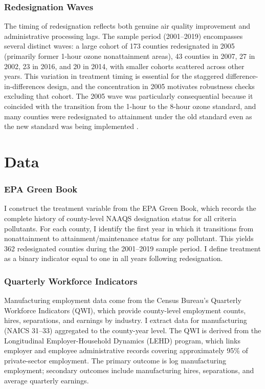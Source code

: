 \documentclass[12pt]{article}
\begin{document}
\subsubsection*{Redesignation Waves} The timing of redesignation reflects both genuine air quality improvement and administrative processing lags. The sample period (2001--2019) encompasses several distinct waves: a large cohort of 173 counties redesignated in 2005 (primarily former 1-hour ozone nonattainment areas), 43 counties in 2007, 27 in 2002, 23 in 2016, and 20 in 2014, with smaller cohorts scattered across other years. This variation in treatment timing is essential for the staggered difference-in-differences design, and the concentration in 2005 motivates robustness checks excluding that cohort. The 2005 wave was particularly consequential because it coincided with the transition from the 1-hour to the 8-hour ozone standard, and many counties were redesignated to attainment under the old standard even as the new standard was being implemented \citep{Auffhammer2009}.


\section{Data}
\label{sec:data}

\subsubsection*{EPA Green Book} I construct the treatment variable from the EPA Green Book, which records the complete history of county-level NAAQS designation status for all criteria pollutants. For each county, I identify the first year in which it transitions from nonattainment to attainment/maintenance status for any pollutant. This yields 362 redesignated counties during the 2001--2019 sample period. I define treatment as a binary indicator equal to one in all years following redesignation.

\subsubsection*{Quarterly Workforce Indicators} Manufacturing employment data come from the Census Bureau's Quarterly Workforce Indicators (QWI), which provide county-level employment counts, hires, separations, and earnings by industry. I extract data for manufacturing (NAICS 31--33) aggregated to the county-year level. The QWI is derived from the Longitudinal Employer-Household Dynamics (LEHD) program, which links employer and employee administrative records covering approximately 95\% of private-sector employment. The primary outcome is log manufacturing employment; secondary outcomes include manufacturing hires, separations, and average quarterly earnings.
\end{document}
